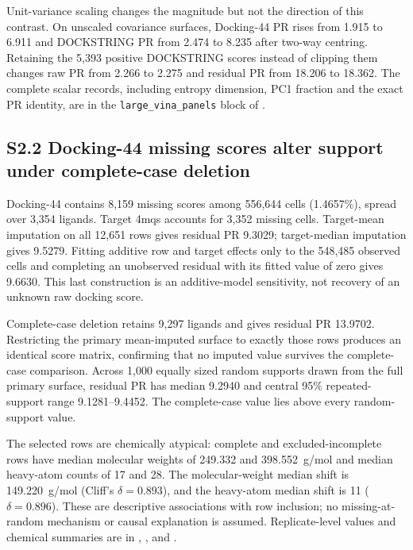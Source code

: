 \documentclass[11pt]{article}
\begin{document}
Unit-variance scaling changes the magnitude but not the direction of this
contrast. On unscaled covariance surfaces, Docking-44 PR rises from 1.915 to
6.911 and DOCKSTRING PR from 2.474 to 8.235 after two-way centring. Retaining
the 5,393 positive DOCKSTRING scores instead of clipping them changes raw PR
from 2.266 to 2.275 and residual PR from 18.206 to 18.362. The complete scalar
records, including entropy dimension, PC1 fraction and the exact PR identity,
are in the \texttt{large\_vina\_panels} block of
.

\subsection*{S2.2 Docking-44 missing scores alter support under complete-case deletion}

Docking-44 contains 8,159 missing scores among 556,644 cells (1.4657\%), spread
over 3,354 ligands. Target 4mqs accounts for 3,352 missing cells. Target-mean
imputation on all 12,651 rows gives residual PR 9.3029; target-median imputation
gives 9.5279. Fitting additive row and target effects only to the 548,485
observed cells and completing an unobserved residual with its fitted value of
zero gives 9.6630. This last construction is an additive-model sensitivity, not
recovery of an unknown raw docking score.

Complete-case deletion retains 9,297 ligands and gives residual PR 13.9702.
Restricting the primary mean-imputed surface to exactly those rows produces an
identical score matrix, confirming that no imputed value survives the
complete-case comparison. Across 1,000 equally sized random supports drawn from
the full primary surface, residual PR has median 9.2940 and central 95\%
repeated-support range 9.1281--9.4452. The complete-case value lies above every
random-support value.

The selected rows are chemically atypical: complete and excluded-incomplete
rows have median molecular weights of 249.332 and 398.552~g/mol and median
heavy-atom counts of 17 and 28. The molecular-weight median shift is
149.220~g/mol (Cliff's $\delta=0.893$), and the heavy-atom median shift is 11
($\delta=0.896$). These are descriptive associations with row inclusion; no
missing-at-random mechanism or causal explanation is assumed. Replicate-level
values and chemical summaries are in
,
,
and .
\end{document}
